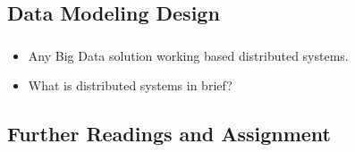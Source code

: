 \subsection{Data Modeling Design}
\begin{frame}
	\frametitle{\subsecname}
	\begin{itemize}[<+->]
		\item Any Big Data solution working based distributed systems.
		\item What is distributed systems in brief?
	\end{itemize}
\end{frame}


\subsection{Further Readings and Assignment}



